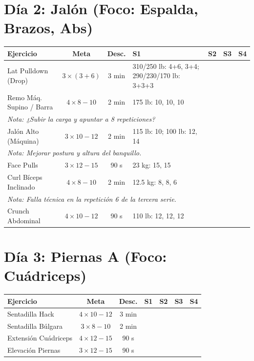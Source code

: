 \documentclass[10pt, a4paper]{article}
\begin{document}
\section*{Día 2: Jalón (Foco: Espalda, Brazos, Abs)}
\begin{tabularx}{\textwidth}{|l|c|c|X|X|X|X|}
\hline
\rowcolor{gray!20}
\textbf{Ejercicio} & \textbf{Meta} & \textbf{Desc.} & \textbf{S1} & \textbf{S2} & \textbf{S3} & \textbf{S4} \\ \hline
Lat Pulldown (Drop) & $3 \times (3+6)$ & 3 min & 310/250 lb: 4+6, 3+4; 290/230/170 lb: 3+3+3 & & & \\ \hline
Remo Máq. Supino / Barra & $4 \times 8-10$ & 2 min & 175 lb: 10, 10, 10 & & & \\ \hline
\multicolumn{7}{|l|}{\scriptsize \textit{Nota: ¿Subir la carga y apuntar a 8 repeticiones?}} \\ \hline
Jalón Alto (Máquina) & $3 \times 10-12$ & 2 min & 115 lb: 10; 100 lb: 12, 14 & & & \\ \hline
\multicolumn{7}{|l|}{\scriptsize \textit{Nota: Mejorar postura y altura del banquillo.}} \\ \hline
Face Pulls & $3 \times 12-15$ & 90 s & 23 kg: 15, 15 & & & \\ \hline
Curl Bíceps Inclinado & $4 \times 8-10$ & 2 min & 12.5 kg: 8, 8, 6 & & & \\ \hline
\multicolumn{7}{|l|}{\scriptsize \textit{Nota: Falla técnica en la repetición 6 de la tercera serie.}} \\ \hline
Crunch Abdominal & $4 \times 10-12$ & 90 s & 110 lb: 12, 12, 12 & & & \\ \hline
\end{tabularx}

\vspace{0.3cm}

\section*{Día 3: Piernas A (Foco: Cuádriceps)}
\begin{tabularx}{\textwidth}{|l|c|c|X|X|X|X|}
\hline
\rowcolor{gray!20}
\textbf{Ejercicio} & \textbf{Meta} & \textbf{Desc.} & \textbf{S1} & \textbf{S2} & \textbf{S3} & \textbf{S4} \\ \hline
Sentadilla Hack & $4 \times 10-12$ & 3 min & & & & \\ \hline
Sentadilla Búlgara & $3 \times 8-10$ & 2 min & & & & \\ \hline
Extensión Cuádriceps & $4 \times 12-15$ & 90 s & & & & \\ \hline
Elevación Piernas & $3 \times 12-15$ & 90 s & & & & \\ \hline
\end{tabularx}
\end{document}
